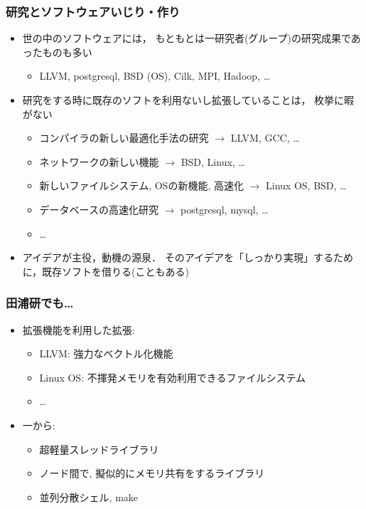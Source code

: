 \documentclass[12pt,dvipdfmx]{beamer}
\newcommand{\ao}[1]{{\color{blue}#1}}
\begin{document}
\begin{frame}
\frametitle{研究とソフトウェアいじり・作り}
\begin{itemize}
\item<1-> 世の中のソフトウェアには，
  もともとは一研究者(グループ)の研究成果であったものも多い
  \begin{itemize}
  \item \ao{LLVM, postgresql, BSD (OS), Cilk, MPI, Hadoop, \ldots}
  \end{itemize}

\item<2-> 研究をする時に既存のソフトを利用ないし拡張していることは，
  枚挙に暇がない
  \begin{itemize}
  \item コンパイラの新しい最適化手法の研究 \ao{$\rightarrow$ LLVM, GCC, \ldots}
  \item ネットワークの新しい機能 \ao{$\rightarrow$ BSD, Linux, \ldots}
  \item 新しいファイルシステム, OSの新機能, 高速化 $\rightarrow$ 
    \ao{Linux OS, BSD, \ldots}
  \item データベースの高速化研究 $\rightarrow$ 
    \ao{postgresql, mysql, \ldots}
  \item \ldots
  \end{itemize}

\item<3-> アイデアが主役，動機の源泉．
  そのアイデアを「しっかり実現」するために，既存ソフトを借りる(こともある)
\end{itemize}
\end{frame}

\iffalse
\begin{frame}
\frametitle{田浦研でも\ldots}
\begin{itemize}
\item<1-> 拡張機能を利用した拡張:
  \begin{itemize}
  \item LLVM: 強力なベクトル化機能
  \item Linux OS: 不揮発メモリを有効利用できるファイルシステム
  \item \ldots
  \end{itemize}

\item<2-> 一から:
  \begin{itemize}
  \item 超軽量スレッドライブラリ
  \item ノード間で, 擬似的にメモリ共有をするライブラリ
  \item 並列分散シェル, make
  \end{itemize}
\end{itemize}
\end{frame}
  
\end{document}
